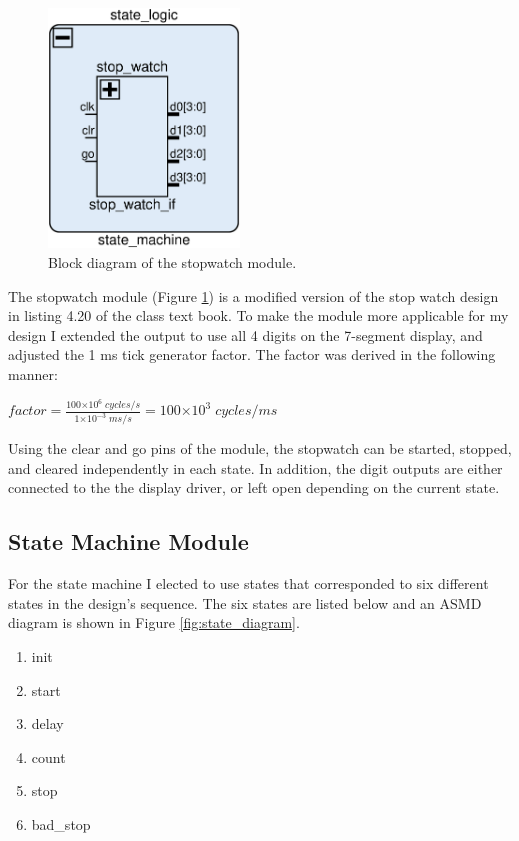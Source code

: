 \documentclass[11pt]{article}
\providecommand{\e}[1]{\ensuremath{\times 10^{#1}}}
\begin{document}
\begin{figure}[H]
\includegraphics [width=2in]{./figures/stopwatch.eps}
	\centering
	\caption{Block diagram of the stopwatch module.}
	\label{fig:stopwatchmod}
\end{figure}

The stopwatch module (Figure \ref{fig:stopwatchmod}) is a modified version of the stop watch design in listing 4.20 of the class text book. To make the module more applicable for my design I extended the output to use all 4 digits on the 7-segment display, and adjusted the 1 ms tick generator factor. The factor was derived in the following manner:

\begin{center}
    $factor = \frac{100\e{6}\; cycles/s}{1\e{-3}\; ms/s} = 100\e{3}\; cycles/ms$
\end{center}
Using the clear and go pins of the module, the stopwatch can be started, stopped, and cleared independently in each state. In addition, the digit outputs are either connected to the the display driver, or left open depending on the current state.

\subsection{State Machine Module}
For the state machine I elected to use states that corresponded to six different states in the design's sequence. The six states are listed below and an ASMD diagram is shown in Figure \ref{fig:state_diagram}.

\begin{enumerate}
    \item init
    \item start
    \item delay
    \item count
    \item stop
    \item bad\_stop
\end{enumerate}
\end{document}
